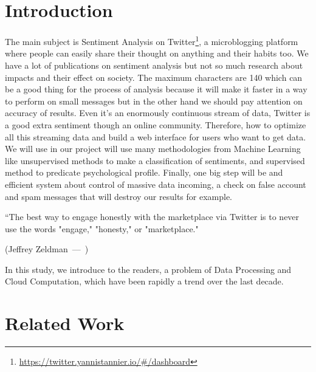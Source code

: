 \documentclass{acmtog} %
\let\oldquote\quote
\let\endoldquote\endquote
\renewenvironment{quote}[2][]
  {\if\relax\detokenize{#1}\relax
     \def\quoteauthor{#2}%
   \else
     \def\quoteauthor{#2~---~#1}%
   \fi
   \oldquote}
  {\par\nobreak\smallskip\hfill(\quoteauthor)%
   \endoldquote\addvspace{\bigskipamount}}
\begin{document}
\section{Introduction}

The main subject is Sentiment Analysis on Twitter\footnote{\url{https://twitter.yannistannier.io/#/dashboard}}, a microblogging platform where people can easily share their thought on anything and their habits too. We have a lot of publications on sentiment analysis but not so much research about impacts and their effect on society. The maximum characters are 140 which can be a good thing for the process of analysis because it will make it faster in a way to perform on small messages but in the other hand we should pay attention on accuracy of results. Even it’s an enormously continuous stream of data, Twitter is a good extra sentiment though an online community. Therefore, how to optimize all this streaming data and build a web interface for users who want to get data. We will use in our project will use many methodologies from Machine Learning like unsupervised methods to make a classification of sentiments, and supervised method to predicate psychological profile. Finally, one big step will be and efficient system about control of massive data incoming, a check on false account and spam messages that will destroy our results for example.
 
\begin{quote}{Jeffrey Zeldman}
“The best way to engage honestly with the marketplace via Twitter is to never use the words "engage," "honesty," or "marketplace." 
\end{quote}

In this study, we introduce to the readers, a problem of Data Processing and Cloud Computation, which have been rapidly a trend over the last decade. 

\section{Related Work}
\label{sec:related_work}
\end{document}
